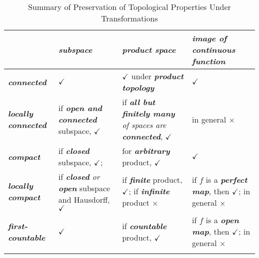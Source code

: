 \documentclass[11pt]{article}
\begin{document}
\begin{table}[h!]
\setlength{\abovedisplayskip}{0pt}
\setlength{\belowdisplayskip}{-10pt}
\setlength{\abovedisplayshortskip}{0pt}
\setlength{\belowdisplayshortskip}{0pt}
\footnotesize
\centering
\caption{Summary of Preservation of Topological Properties Under Transformations}
\label{tab: preservation}
\renewcommand\tabularxcolumn[1]{m{#1}}
\small
\begin{tabularx}{1\textwidth} { 
  | >{\raggedright\arraybackslash} m{3cm}
  | >{\centering\arraybackslash}X
  | >{\centering\arraybackslash}X
  | >{\centering\arraybackslash}X  | }
 \hline
  &  \emph{\textbf{subspace}} &  \emph{\textbf{product space}} &  \emph{\textbf{image of continuous function}}   \\
  \hline \vspace{5pt}
\emph{\textbf{connected}}  \vspace{2pt} & $\checkmark$  &   $\checkmark$ under \emph{\textbf{product topology}}  &   $\checkmark$  \\
\hline \vspace{5pt}
\emph{\textbf{locally connected}}  \vspace{2pt} & if \emph{\textbf{open and connected}} subspace, $\checkmark$  & if \emph{\textbf{all but finitely many} of spaces are \textbf{connected}},  $\checkmark$  & in general  $\times$  \\
 \hline \vspace{5pt}
\emph{\textbf{compact}}  \vspace{2pt} & if \emph{\textbf{closed}} subspace, $\checkmark$;  & for \emph{\textbf{arbitrary}} product, $\checkmark$ & $\checkmark$ \\
 \hline \vspace{5pt}
\emph{\textbf{locally compact}}  \vspace{2pt} & if \emph{\textbf{closed} or \textbf{open}} subspace and Hausdorff, $\checkmark$  & if \emph{\textbf{finite}} product, $\checkmark$; if \emph{\textbf{infinite}} product $\times$ & if $f$ is a \emph{\textbf{perfect map}}, then $\checkmark$; in general $\times$ \\
 \hline \vspace{5pt}
\emph{\textbf{first-countable}} \vspace{2pt}  &  $\checkmark$ & if \emph{\textbf{countable}} product, $\checkmark$ &  if $f$ is a \emph{\textbf{open map}}, then $\checkmark$; in general $\times$ \\
\hline \vspace{5pt}

\end{tabularx}
\end{table}
\end{document}
